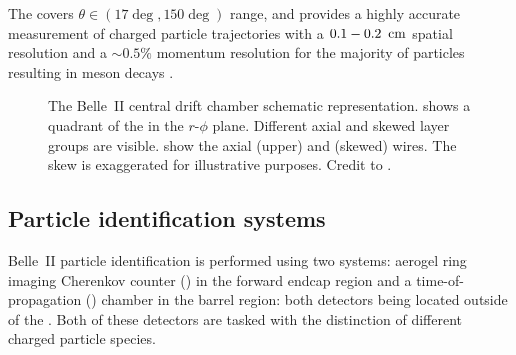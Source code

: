 The \CDC covers $\theta\in(17\deg,150\deg)$ range, and provides a highly accurate measurement of charged particle trajectories with a $0.1-0.2~{\rm \,cm}$ spatial resolution 
and a $\sim0.5\%$ momentum resolution for the majority of particles resulting in \B meson decays \cite{Kandra:2019qlz}.

\begin{figure}[htbp!]
    \centering
    \caption{\label{fig:cdc}
    The Belle~II central drift chamber schematic representation.
     shows a quadrant of the \CDC in the $r$-$\phi$ plane.
    Different axial and skewed layer groups are visible.
     show the axial (upper) and (skewed) wires.
    The skew is exaggerated for illustrative purposes.
    Credit to \cite{BelleIITrackingGroup:2020hpx}.
    }
\end{figure}

\subsection{Particle identification systems}\label{sec:pid}

Belle~II particle identification is performed using two systems: aerogel ring imaging Cherenkov counter (\ARICH) in the forward endcap region
and a time-of-propagation (\TOP) chamber in the barrel region: both detectors being located outside of the \CDC.
Both of these detectors are tasked with the distinction of different charged particle species.

